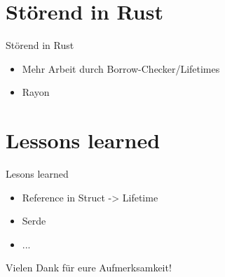 \documentclass[aspectratio=169]{beamer}
\begin{document}
\section{Störend in Rust}
\begin{frame}{Störend in Rust}
    \begin{itemize}[<+->]
        \item Mehr Arbeit durch Borrow-Checker/Lifetimes
        \item Rayon
    \end{itemize}
\end{frame}
\section{Lessons learned}
\begin{frame}{Lesons learned}
    \begin{itemize}[<+->]
        \item Reference in Struct -> Lifetime
        \item Serde
        \item ...
    \end{itemize}
\end{frame}

\begin{frame}[standout]
\centering
\Huge Vielen Dank für eure Aufmerksamkeit!

\end{frame}
\end{document}
